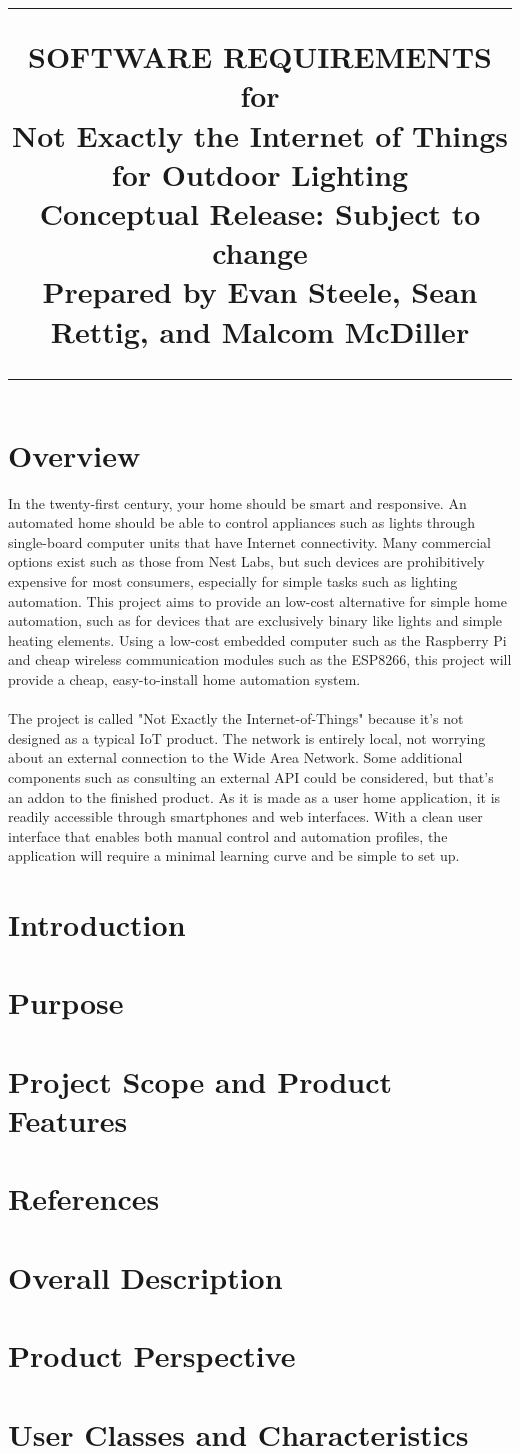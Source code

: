 \documentclass[oneside,openright]{scrreprt}
\title{
	\flushright
		\rule{16cm}{5pt}\vskip1cm
		\Huge{SOFTWARE REQUIREMENTS}\\
		\vspace{2cm}
	for\\
		\vspace{2cm}
	Not Exactly the Internet of Things for Outdoor Lighting\\
		\vspace{2cm}
	\LARGE{Conceptual Release:}
	\vspace{2cm}
	\LARGE{Subject to change\\}
	\vspace{2cm}
	Prepared by Evan Steele, Sean Rettig, and Malcom McDiller\\
		\vfill
		\rule{16cm}{5pt}
}
\date{}
\begin{document}
\maketitle
\tableofcontents
\newpage
\section{Overview}
In the twenty-first century, your home should be smart and responsive. An automated home should be able to control appliances such as lights through single-board computer units that have Internet connectivity. Many commercial options exist such as those from Nest Labs, but such devices are prohibitively expensive for most consumers, especially for simple tasks such as lighting automation. This project aims to provide an low-cost alternative for simple home automation, such as for devices that are exclusively binary like lights and simple heating elements. Using a low-cost embedded computer such as the Raspberry Pi and cheap wireless communication modules such as the ESP8266, this project will provide a cheap, easy-to-install home automation system.\\
\\The project is called "Not Exactly the Internet-of-Things" because it's not designed as a typical IoT product. The network is entirely local, not worrying about an external connection to the Wide Area Network. Some additional components such as consulting an external API could be considered, but that's an addon to the finished product. As it is made as a user home application, it is readily accessible through smartphones and web interfaces. With a clean user interface that enables both manual control and automation profiles, the application will require a minimal learning curve and be simple to set up.  
\section{Introduction}
\section{Purpose}
\section{Project Scope and Product Features}
\section{References}
\section{Overall Description}
\section{Product Perspective}
\section{User Classes and Characteristics}
\end{document}

